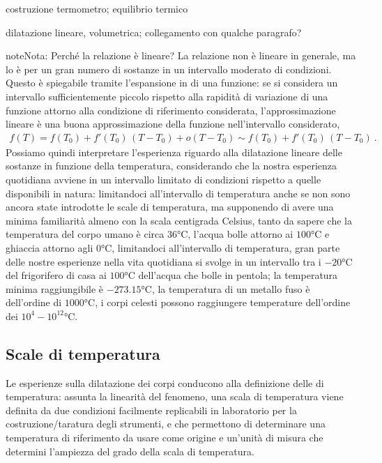 \documentclass[letterpaper,10pt,italian]{jupyterBook}
\begin{document}
\sphinxAtStartPar
{} costruzione termometro; equilibrio termico

\sphinxAtStartPar
{} dilatazione lineare, volumetrica; collegamento con qualche paragrafo?

\begin{sphinxadmonition}{note}{Nota:}
\sphinxAtStartPar
Perché la relazione è lineare?
La relazione non è lineare in generale, ma lo è per un gran numero di sostanze in un intervallo moderato di condizioni. Questo è spiegabile tramite l’espansione in  di una funzione: se si considera un intervallo sufficientemente piccolo rispetto alla rapidità di variazione di una funzione attorno alla condizione di riferimento considerata, l’approssimazione lineare è una buona approssimazione della funzione nell’intervallo considerato,
\begin{equation*}
\begin{split}f(T) = f(T_0) + f'(T_0) \, ( T - T_0 ) + o(T-T_0) \sim f(T_0) + f'(T_0) \, ( T - T_0 ) \ .\end{split}
\end{equation*}
\sphinxAtStartPar
Possiamo quindi interpretare l’esperienza riguardo alla dilatazione lineare delle sostanze in funzione della temperatura, considerando che la nostra esperienza quotidiana avviene in un intervallo limitato di condizioni rispetto a quelle disponibili in natura: limitandoci all’intervallo di temperatura anche se non sono ancora state introdotte le scale di temperatura, ma supponendo di avere una minima familiarità almeno con la scala centigrada Celsius, tanto da sapere che la temperatura del corpo umano è circa \(36\text{°C}\), l’acqua bolle attorno ai \(100\text{°C}\) e ghiaccia attorno agli \(0\text{°C}\), limitandoci all’intervallo di temperatura, gran parte delle nostre esperienze nella vita quotidiana si svolge in un intervallo tra i \(-20\text{°C}\) del frigorifero di casa ai \(100\text{°C}\) dell’acqua che bolle in pentola; la temperatura minima raggiungibile è \(-273.15\text{°C}\), la temperatura di un metallo fuso è dell’ordine di \(1000\text{°C}\), i corpi celesti possono raggiungere temperature dell’ordine dei \(10^4-10^{12}\text{°C}\).
\end{sphinxadmonition}


\subsection{Scale di temperatura}
\label{\detokenize{ch/thermodynamics/foundation-experiments:scale-di-temperatura}}
\sphinxAtStartPar
{} Le esperienze sulla dilatazione dei corpi conducono alla definizione delle  di temperatura: assunta la linearità del fenomeno, una scala di temperatura viene definita da due condizioni facilmente replicabili in laboratorio per la costruzione/taratura degli strumenti, e che permettono di determinare una temperatura di riferimento da usare come origine e un’unità di misura che determini l’ampiezza del grado della scala di temperatura.
\end{document}
